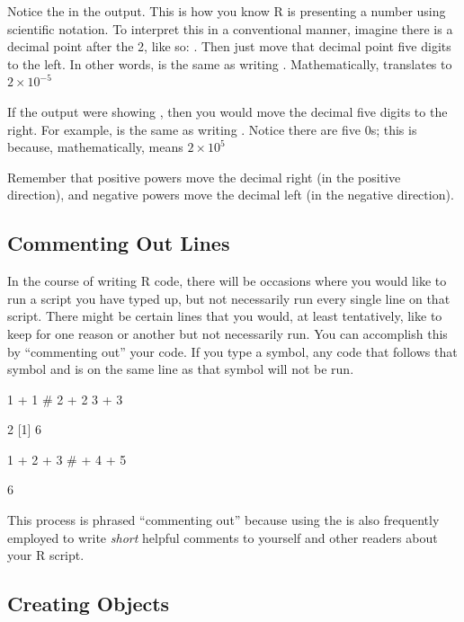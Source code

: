 Notice the  in the output. This is how you know R is presenting a number using scientific notation. To interpret this in a conventional manner, imagine there is a decimal point after the 2, like so: . Then just move that decimal point five digits to the left. In other words,  is the same as writing . Mathematically,  translates to $2 \times 10^{-5}$

If the output were showing , then you would move the decimal five digits to the right. For example,  is the same as writing . Notice there are five 0s; this is because, mathematically,  means $2 \times 10^5$

Remember that positive powers move the decimal right (in the positive direction), and negative powers move the decimal left (in the negative direction).


\subsection{Commenting Out Lines}
In the course of writing R code, there will be occasions where you would like to run a script you have typed up, but not necessarily run every single line on that script.  There might be certain lines that you would, at least tentatively, like to keep for one reason or another but not necessarily run.  You can accomplish this by ``commenting out'' your code.  If you type a \R{\#} symbol, any code that follows that symbol and is on the same line as that symbol will not be run.

\begin{inR}
1 + 1
# 2 + 2
3 + 3
\end{inR}
\begin{outR}
[1] 2
[1] 6
\end{outR}

\begin{inR}
1 + 2 + 3 # + 4 + 5
\end{inR}
\begin{outR}
[1] 6
\end{outR}

\noindent
This process is phrased ``commenting out'' because using the \R{\#} is also frequently employed to write \textit{short} helpful comments to yourself and other readers about your R script.


\subsection{Creating Objects}


